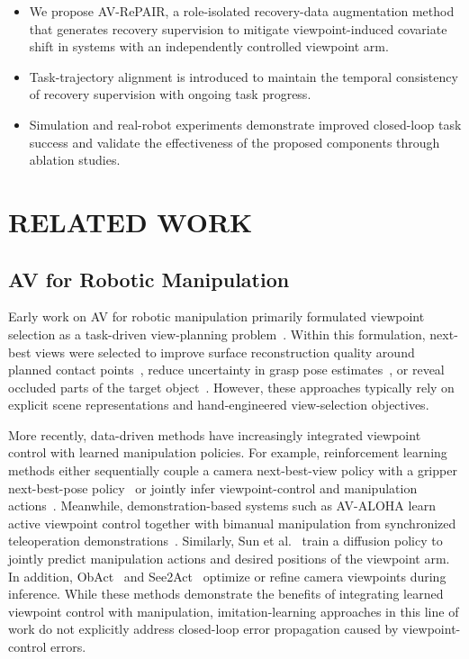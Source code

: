\documentclass[letterpaper, 10 pt, conference]{ieeeconf}  %
\begin{document}
\begin{itemize}
\item[1)]
We propose AV-RePAIR, a role-isolated recovery-data augmentation method that generates recovery supervision to mitigate viewpoint-induced covariate shift in systems with an independently controlled viewpoint arm.
\item[2)]
Task-trajectory alignment is introduced to maintain the temporal consistency of recovery supervision with ongoing task progress.
\item[3)]
Simulation and real-robot experiments demonstrate improved closed-loop task success and validate the effectiveness of the proposed components through ablation studies.
\end{itemize}

\section{RELATED WORK}


\subsection{AV for Robotic Manipulation}
Early work on AV for robotic manipulation primarily formulated viewpoint selection as a task-driven view-planning problem~\cite{zengViewPlanningRobot2020}. Within this formulation, next-best views were selected to improve surface reconstruction quality around planned contact points~\cite{arrudaActiveVisionDexterous2016}, reduce uncertainty in grasp pose estimates~\cite{morrisonMultiViewPickingNextbestview2019}, or reveal occluded parts of the target object~\cite{breyerClosedLoopNextBestViewPlanning2022}. 
However, these approaches typically rely on explicit scene representations and hand-engineered view-selection objectives.

More recently, data-driven methods have increasingly integrated viewpoint control with learned manipulation policies. For example, reinforcement learning methods either sequentially couple a camera next-best-view policy with a gripper next-best-pose policy~\cite{wangObserveThenAct2025} or jointly infer viewpoint-control and manipulation actions~\cite{wangOneModelTwo2025}. Meanwhile, demonstration-based systems such as AV-ALOHA learn active viewpoint control together with bimanual manipulation from synchronized teleoperation demonstrations~\cite{chuangActiveVisionMight2025}. Similarly, Sun et al.~\cite{sunOptimizingActivePerception2025} train a diffusion policy to jointly predict manipulation actions and desired positions of the viewpoint arm. In addition, ObAct~\cite{wangObserverActorActiveVision2026} and See2Act~\cite{wangLearningSeeLearning2026} optimize or refine camera viewpoints during inference. 
While these methods demonstrate the benefits of integrating learned viewpoint control with manipulation, imitation-learning approaches in this line of work do not explicitly address closed-loop error propagation caused by viewpoint-control errors.
\end{document}
